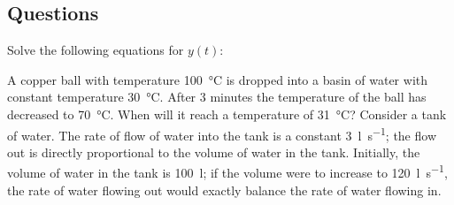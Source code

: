 \subsection*{Questions}
\begin{questions}
  \question Solve the following equations for $ y(t) $:
  \question A copper ball with temperature \SI{100}{\celsius} is dropped into a basin of water with constant temperature
            \SI{30}{\celsius}. After 3 minutes the temperature of the ball has decreased to \SI{70}{\celsius}. When will
            it reach a temperature of \SI{31}{\celsius}?
  \question Consider a tank of water. The rate of flow of water into the tank is a constant \SI{3}{\litre\per\second};
            the flow out is directly proportional to the volume of water in the tank. Initially, the volume of water
            in the tank is \SI{100}{\litre}; if the volume were to increase to  \SI{120}{\litre\per\second}, the rate
            of water flowing out would exactly balance the rate of water flowing in.
\end{questions}

